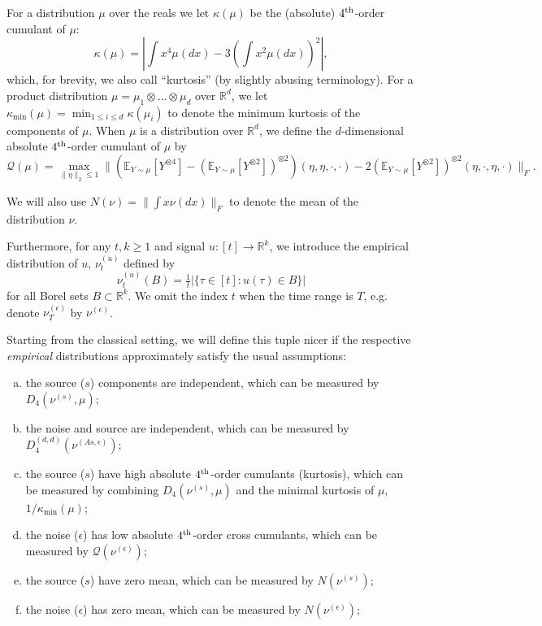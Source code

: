 \documentclass[11pt]{article}
\newcommand{\E}{\mathbb{E}}
\newcommand{\real}{\mathbb{R}}
\newcommand{\cQ}{\mathcal{Q}}
\newcommand{\eps}{\epsilon}
\begin{document}
For a distribution $\mu$ over the reals we let $\kappa(\mu)$ be the (absolute) $4^{\rm th}$-order cumulant of $\mu$: 
$$\kappa(\mu) = |\int x^4 \mu(dx) - 3 (\int x^2 \mu(dx))^2|,$$
which, for brevity, we also call ``kurtosis'' (by slightly abusing terminology).
For a product distribution $\mu= \mu_1\otimes \ldots \otimes \mu_d$ over $\real^d$, we let $\kappa_{\min}(\mu)
=\min_{1\le i \le d} \kappa(\mu_i)$ to denote the minimum kurtosis of the components of $\mu$.
When $\mu$ is a distribution over $\real^d$, we define the $d$-dimensional absolute 
$4^{\rm th}$-order cumulant of $\mu$ by 
$$\cQ(\mu) = \max_{\|\eta\|_2 \le 1}\| \left(\E_{Y\sim \mu} [Y^{\otimes4}] - (\E_{Y\sim \mu} [Y^{\otimes2}])^{\otimes 2}\right)(\eta,\eta,\cdot,\cdot)  - 2 (\E_{Y\sim \mu} [Y^{\otimes2}])^{\otimes 2}(\eta,\cdot,\eta,\cdot)\|_F.$$

We will also use $N(\nu) = \|\int x \nu(dx)\|_F$ to denote the mean of the distribution $\nu$. 

Furthermore, for any $t,k \ge 1$ and signal $u:[t] \to \real^k$, we introduce the empirical distribution of $u$, $\nu_t^{(u)}$ defined by
$$\nu_t^{(u)}(B)=\tfrac{1}{t}|\{\tau \in [t]: u(\tau) \in B\}|$$ for all Borel sets $B \subset \real^k$. We omit the index $t$ when the time range is $T$, e.g. denote $\nu_T^{(\eps)}$ by $\nu^{(\eps)}$. 

Starting from the classical setting, we will define this tuple nicer if the respective \emph{empirical} 
distributions approximately satisfy the usual assumptions: 
\begin{enumerate}[(a)]
	\itemsep0em
	\item the source ($s$) components are independent, which can be measured by $D_4(\nu^{(s)},\mu)$;
	\item the noise and source are independent, which can be measured by $D_4^{(d,d)}(\nu^{(As,\eps)})$;
	\item the source ($s$) have high absolute $4^{\rm th}$-order cumulants (kurtosis), which can be measured by combining $D_4(\nu^{(s)},\mu)$ and the minimal kurtosis of $\mu$, $1/\kappa_{\min}(\mu)$;
	\item the noise ($\eps$) has low absolute $4^{\rm th}$-order cross cumulants, which can be measured by $\cQ(\nu^{(\eps)})$;
	\item the source ($s$) have zero mean, which can be measured by $N(\nu^{(s)})$;
	\item the noise ($\eps$) has  zero mean, which can be measured by $N(\nu^{(\eps)})$;
\end{enumerate}
\end{document}
